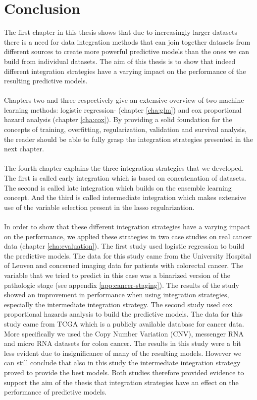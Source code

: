 \chapter{Conclusion}
\label{cha:conclusion}
The first chapter in this thesis shows that due to increasingly larger datasets there is a need for data integration methods that can join together datasets from different sources to create more powerful predictive models than the ones we can build from individual datasets. The aim of this thesis is to show that indeed different integration strategies have a varying impact on the performance of the resulting predictive models. \\ \\
Chapters two and three respectively give an extensive overview of two machine learning methods: logistic regression- (chapter \ref{cha:glm}) and cox proportional hazard analysis (chapter \ref{cha:cox}). By providing a solid foundation for the concepts of training, overfitting, regularization, validation and survival analysis, the reader should be able to fully grasp the integration strategies presented in the next chapter. \\ \\
The fourth chapter explains the three integration strategies that we developed. The first is called early integration which is based on concatenation of datasets. The second is called late integration which builds on the ensemble learning concept. And the third is called intermediate integration which makes extensive use of the variable selection present in the lasso regularization. \\ \\
In order to show that these different integration strategies have a varying impact on the performance, we applied these strategies in two case studies on real cancer data (chapter \ref{cha:evaluation}). The first study used logistic regression to build the predictive models. The data for this study came from the University Hospital of Leuven and concerned imaging data for patients with colorectal cancer. The variable that we tried to predict in this case was a binarized version of the pathologic stage (see appendix \ref{app:cancer-staging}). The results of the study showed an improvement in performance when using integration strategies, especially the intermediate integration strategy. The second study used cox proportional hazards analysis to build the predictive models. The data for this study came from TCGA which is a publicly available database for cancer data. More specifically we used the Copy Number Variation (CNV), messenger RNA and micro RNA datasets for colon cancer. The results in this study were a bit less evident due to insignificance of many of the resulting models. However we can still conclude that also in this study the intermediate integration strategy proved to provide the best models. Both studies therefore provided evidence to support the aim of the thesis that integration strategies have an effect on the performance of predictive models. \\ \\
